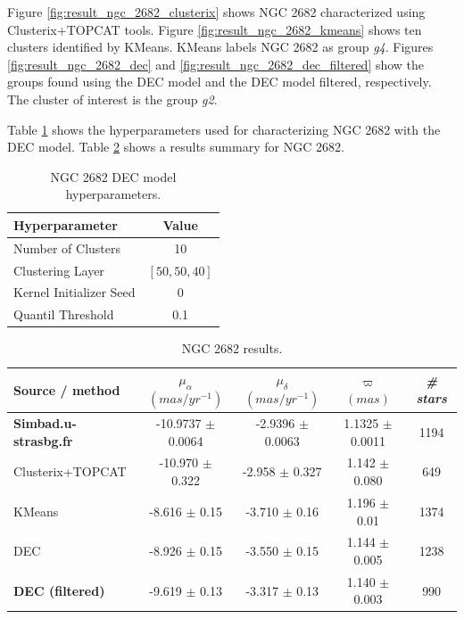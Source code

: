 \documentclass[11pt, a4paper, english]{book}
\begin{document}
\newpage

Figure \ref{fig:result_ngc_2682_clusterix} shows NGC 2682 characterized using Clusterix+TOPCAT tools.
Figure \ref{fig:result_ngc_2682_kmeans} shows ten clusters identified by KMeans.
KMeans labels NGC 2682 as group \emph{g4}.
Figures \ref{fig:result_ngc_2682_dec} and \ref{fig:result_ngc_2682_dec_filtered}
show the groups found using the DEC model and the DEC model filtered, respectively.
The cluster of interest is the group \emph{g2}.

Table \ref{tab:hyperparameters_ngc_2682} shows the hyperparameters used for characterizing NGC 2682
with the DEC model. Table \ref{tab:results_ngc_2682} shows a results summary for NGC 2682.

\vfill

\begin{table}[h]
  \begin{center}
    \begin{tabular}{l|c}
      \textbf{Hyperparameter} & \textbf{Value} \\
      \hline
      Number of Clusters & 10 \\
      Clustering Layer & $\left[ 50, 50, 40 \right]$ \\
      Kernel Initializer Seed & 0 \\
      Quantil Threshold & 0.1 \\
    \end{tabular}
    \caption{NGC 2682 DEC model hyperparameters.}
    \label{tab:hyperparameters_ngc_2682}
  \end{center}
\end{table}

\vfill

\begin{table}[h]
  \begin{center}
    \begin{tabular}{l|c|c|c|c}
      \textbf{Source / method} & \emph{$\mu_{\alpha}$ $(mas/yr^{-1})$} & \emph{$\mu_{\delta}$ $(mas/yr^{-1})$} & \emph{$\varpi$ $(mas)$} & \emph{\# stars} \\
      \hline
      \textbf{Simbad.u-strasbg.fr} & -10.9737 $\pm$ 0.0064 & -2.9396 $\pm$ 0.0063 & 1.1325 $\pm$ 0.0011 & 1194 \\
      Clusterix+TOPCAT & -10.970 $\pm$ 0.322 & -2.958 $\pm$ 0.327 & 1.142 $\pm$ 0.080 & 649 \\
      KMeans & -8.616 $\pm$ 0.15 & -3.710 $\pm$ 0.16 & 1.196 $\pm$ 0.01 & 1374 \\
      DEC & -8.926 $\pm$ 0.15 & -3.550 $\pm$ 0.15 & 1.144 $\pm$ 0.005 & 1238 \\
      \textbf{DEC (filtered)} & -9.619 $\pm$ 0.13 & -3.317 $\pm$ 0.13 & 1.140 $\pm$ 0.003 & 990 \\
    \end{tabular}
    \caption{NGC 2682 results.}
    \label{tab:results_ngc_2682}
  \end{center}
\end{table}
\end{document}

